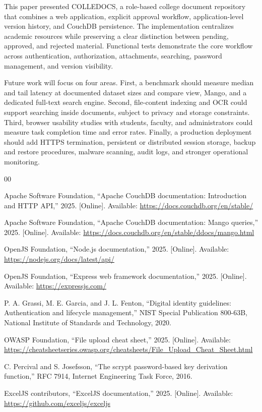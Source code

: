 \documentclass[conference]{IEEEtran}
\begin{document}
This paper presented COLLEDOCS, a role-based college document repository that combines a web application, explicit approval workflow, application-level version history, and CouchDB persistence. The implementation centralizes academic resources while preserving a clear distinction between pending, approved, and rejected material. Functional tests demonstrate the core workflow across authentication, authorization, attachments, searching, password management, and version visibility.

Future work will focus on four areas. First, a benchmark should measure median and tail latency at documented dataset sizes and compare view, Mango, and a dedicated full-text search engine. Second, file-content indexing and OCR could support searching inside documents, subject to privacy and storage constraints. Third, browser usability studies with students, faculty, and administrators could measure task completion time and error rates. Finally, a production deployment should add HTTPS termination, persistent or distributed session storage, backup and restore procedures, malware scanning, audit logs, and stronger operational monitoring.

\balance
\begin{thebibliography}{00}

Apache Software Foundation, ``Apache CouchDB documentation: Introduction and HTTP API,'' 2025. [Online]. Available: \url{https://docs.couchdb.org/en/stable/}

Apache Software Foundation, ``Apache CouchDB documentation: Mango queries,'' 2025. [Online]. Available: \url{https://docs.couchdb.org/en/stable/ddocs/mango.html}

OpenJS Foundation, ``Node.js documentation,'' 2025. [Online]. Available: \url{https://nodejs.org/docs/latest/api/}

OpenJS Foundation, ``Express web framework documentation,'' 2025. [Online]. Available: \url{https://expressjs.com/}

P. A. Grassi, M. E. Garcia, and J. L. Fenton, ``Digital identity guidelines: Authentication and lifecycle management,'' NIST Special Publication 800-63B, National Institute of Standards and Technology, 2020.

OWASP Foundation, ``File upload cheat sheet,'' 2025. [Online]. Available: \url{https://cheatsheetseries.owasp.org/cheatsheets/File_Upload_Cheat_Sheet.html}

C. Percival and S. Josefsson, ``The scrypt password-based key derivation function,'' RFC 7914, Internet Engineering Task Force, 2016.

ExcelJS contributors, ``ExcelJS documentation,'' 2025. [Online]. Available: \url{https://github.com/exceljs/exceljs}

\end{thebibliography}
\end{document}

